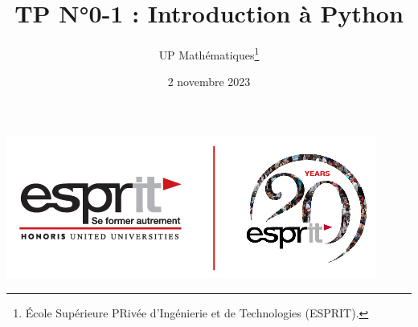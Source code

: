 \documentclass[%
oneside,                 %
final,                   %
10pt,french]{article}
\begin{document}

\newcommand{\exercisesection}[1]{\subsection*{#1}}






\title{{\color{seccolor} TP N°0-1 : Introduction à Python}}


\author{UP Mathématiques\footnote{École Supérieure PRivée d'Ingénierie et de Technologies (ESPRIT).}}


\date{2 novembre 2023}
\maketitle

\vspace{6mm}

\centerline{\includegraphics[width=0.45\linewidth]{imgs/Signature-01.jpg}}

\vspace{6mm}



\end{document}
